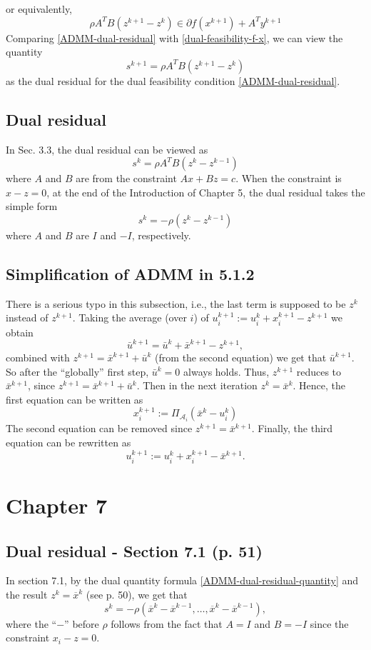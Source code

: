 \documentclass{article}
\theoremstyle{remark}
\begin{document}
or equivalently,
\begin{equation}\label{ADMM-dual-residual}
\rho A^TB(z^{k+1}-z^k)\in\partial f(x^{k+1})+ A^Ty^{k+1}
\end{equation}
Comparing \eqref{ADMM-dual-residual} with \eqref{dual-feasibility-f-x}, we can view the quantity
\begin{equation}\label{ADMM-dual-residual-quantity}
s^{k+1}=\rho A^TB(z^{k+1}-z^k)
\end{equation}
as the dual residual for the dual feasibility condition \eqref{ADMM-dual-residual}.

\subsection{Dual residual}
In Sec. 3.3, the dual residual can be viewed as
\[
s^{k}=\rho A^TB(z^k-z^{k-1})
\]
where $A$ and $B$ are from the constraint $Ax+Bz=c$. When the constraint is $x-z=0$, at the end of the Introduction of Chapter 5, the dual residual takes the simple form
\[
s^{k}=-\rho (z^k-z^{k-1})
\]
where $A$ and $B$ are $I$ and $-I$, respectively.

\subsection{Simplification of ADMM in 5.1.2}
There is a serious typo in this subsection, i.e., the last term is supposed to be $z^k$ instead of $z^{k+1}$. Taking the average (over $i$) of $u_i^{k+1}:=u_i^k + x_i^{k+1}-z^{k+1}$ we obtain
\[
\bar{u}^{k+1}=\bar{u}^k + \bar{x}^{k+1}-z^{k+1},
\]
combined with $z^{k+1}=\bar{x}^{k+1}+\bar{u}^k$ (from the second equation) we get that $\bar{u}^{k+1}$. So after the ``globally'' first step, $\bar{u}^{k}=0$ always holds. Thus, $z^{k+1}$ reduces to $\bar{x}^{k+1}$, since $z^{k+1}=\bar{x}^{k+1}+\bar{u}^k$. Then in the next iteration $z^k=\bar{x}^k$. Hence, the first equation can be written as
\[
x_i^{k+1}:=\Pi_{\mathcal{A}_i}(\bar{x}^k-u_i^k)
\]
The second equation can be removed since $z^{k+1}=\bar{x}^{k+1}$. Finally, the third equation can be rewritten as
\[
u_i^{k+1}:=u_i^{k}+x_i^{k+1}-\bar{x}^{k+1}.
\]

\section{Chapter 7}
\subsection{Dual residual - Section 7.1 (p. 51)}
In section 7.1, by the dual quantity formula \eqref{ADMM-dual-residual-quantity} and the result $z^k=\overline{x}^k$ (see p. 50), we get that
\[
s^k=-\rho(\overline{x}^k-\overline{x}^{k-1},\ldots,\overline{x}^k-\overline{x}^{k-1}),
\]
where the ``$-$'' before $\rho$ follows from the fact that $A=I$ and $B=-I$ since the constraint $x_i-z=0$.
\end{document}
